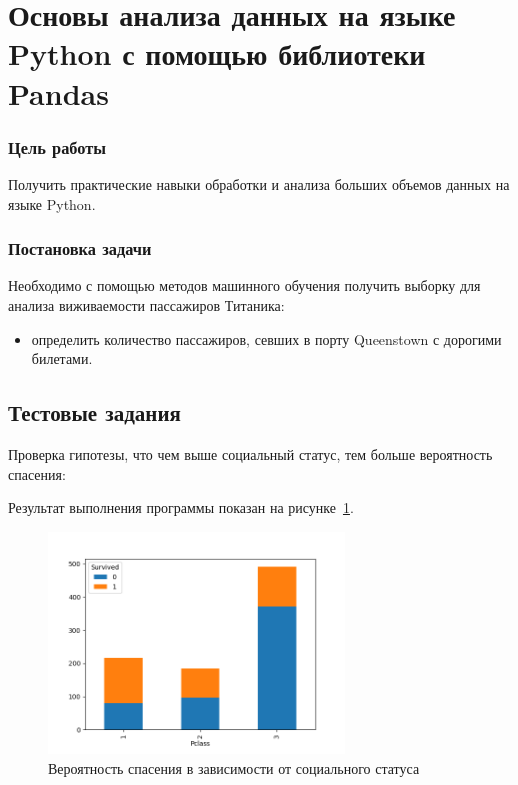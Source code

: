 



\newcommand{\labnumber}{1} %



\graphicspath{{figures/}}


\Ukrainian


\addtocounter{page}{1}

\section*{Основы анализа данных на языке Python с помощью библиотеки Pandas}
\subsubsection*{Цель работы}
Получить практические навыки обработки и анализа больших объемов данных на языке Python.
\subsubsection*{Постановка задачи}
Необходимо с помощью методов машинного обучения получить выборку для анализа виживаемости пассажиров Титаника:
\begin{itemize}
  \item определить количество пассажиров, севших в порту Queenstown с дорогими билетами.
\end{itemize}

\subsection*{Тестовые задания}
Проверка гипотезы, что чем выше социальный статус, тем больше вероятность спасения:
 

Результат выполнения программы показан на рисунке~\ref{fig:example1}.

\begin{figure}[H]
    \centering
        \includegraphics[width=0.7\textwidth]{example1}
    \caption{Вероятность спасения в зависимости от социального статуса}
    \label{fig:example1}
\end{figure}

